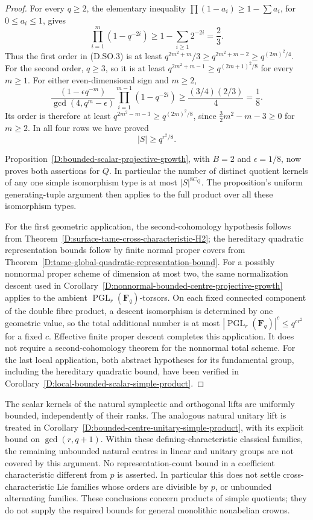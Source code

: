 \begin{proof}
For every $q\ge2$, the elementary inequality
$\prod(1-a_i)\ge1-\sum a_i$, for $0\le a_i\le1$, gives
\[
             \prod_{i=1}^{m}(1-q^{-2i})
                 \ge1-\sum_{i\ge1}2^{-2i}=\frac23.
\]
Thus the first order in (D.SO.3) is at least
$q^{2m^2+m}/3\ge q^{2m^2+m-2}\ge q^{(2m)^2/4}$.
For the second order, $q\ge3$, so it is at least
$q^{2m^2+m-1}\ge q^{(2m+1)^2/8}$ for every $m\ge1$.
For either even-dimensional sign and $m\ge2$,
\[
 \frac{(1-\epsilon q^{-m})}{\gcd(4,q^m-\epsilon)}
       \prod_{i=1}^{m-1}(1-q^{-2i})
       \ge\frac{(3/4)(2/3)}4=\frac18.
\]
Its order is therefore at least
$q^{2m^2-m-3}\ge q^{(2m)^2/8}$, since
$\tfrac32m^2-m-3\ge0$ for $m\ge2$.
In all four rows we have proved
\[
                         |S|\ge q^{r^2/8}.                  \tag{D.SO.4}
\]

Proposition~\ref{D:bounded-scalar-projective-growth}, with
$B=2$ and $\epsilon=1/8$, now proves both assertions for $Q$.
In particular the number of distinct quotient kernels of any
one simple isomorphism type is at most $|S|^{8C_Q}$.
The proposition's uniform generating-tuple argument then applies
to the full product over all these isomorphism types.

For the first geometric application, the second-cohomology
hypothesis follows from
Theorem~\ref{D:surface-tame-cross-characteristic-H2}; the
hereditary quadratic representation bounds follow by finite
normal proper covers from
Theorem~\ref{D:tame-global-quadratic-representation-bound}.
For a possibly nonnormal proper scheme of dimension at most two,
the same normalization descent used in
Corollary~\ref{D:nonnormal-bounded-centre-projective-growth}
applies to the ambient $\operatorname{PGL}_r(\mathbf F_q)$-torsors.
On each fixed connected component of the double fibre product,
a descent isomorphism is determined by one geometric value,
so the total additional number is at most
$|\operatorname{PGL}_r(\mathbf F_q)|^c\le q^{cr^2}$ for a fixed
$c$. Effective finite proper descent
\citep[IX, Theorem~4.7]{C_SGA1} completes this application.
It does not require a second-cohomology theorem for the
nonnormal total scheme.
For the last local application, both abstract hypotheses for its
fundamental group, including the hereditary quadratic bound, have
been verified in
Corollary~\ref{D:local-bounded-scalar-simple-product}.
\end{proof}

\begin{remark}
The scalar kernels of the natural symplectic and orthogonal
lifts are uniformly bounded, independently of their ranks.
The analogous natural unitary lift is treated in
Corollary~\ref{D:bounded-centre-unitary-simple-product}, with
its explicit bound on $\gcd(r,q+1)$. Within these
defining-characteristic classical families, the remaining unbounded
natural centres in linear and unitary groups are not covered
by this argument. No representation-count bound in a coefficient
characteristic different from $p$ is asserted. In particular this
does not settle cross-characteristic Lie families whose orders
are divisible by $p$, or unbounded alternating families.
These conclusions concern products of simple
quotients; they do not supply the required bounds for general
monolithic nonabelian crowns.
\end{remark}
